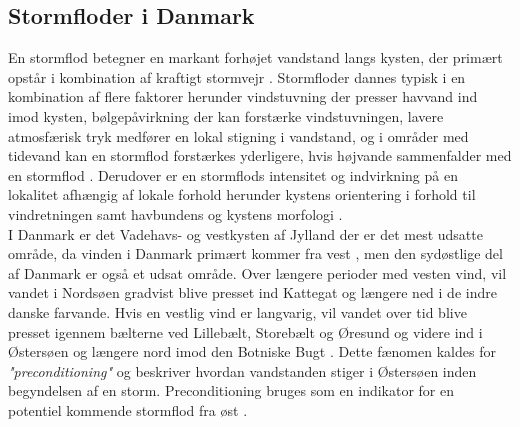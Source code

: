 
\subsection{Stormfloder i Danmark} \label{Afsnit: Stormfloder}

En stormflod betegner en markant forhøjet vandstand langs kysten, der primært opstår i kombination af kraftigt stormvejr \citep{shoreline_management_guidelines}. Stormfloder dannes typisk i en kombination af flere faktorer herunder vindstuvning der presser havvand ind imod kysten, bølgepåvirkning der kan forstærke vindstuvningen, lavere atmosfærisk tryk medfører en lokal stigning i vandstand, og i områder med tidevand kan en stormflod forstærkes yderligere, hvis højvande sammenfalder med en stormflod \citep{piecuch_high-tide_2022}. Derudover er en stormflods intensitet og indvirkning på en lokalitet afhængig af lokale forhold herunder kystens orientering i forhold til vindretningen samt havbundens og kystens morfologi \citep{noaa_storm, shoreline_management_guidelines}.\\

I Danmark er det Vadehavs- og vestkysten af Jylland der er det mest udsatte område, da vinden i Danmark primært kommer fra vest \citep{cappelen_dmi_2020}, men den sydøstlige del af Danmark er også et udsat område. Over længere perioder med vesten vind, vil vandet i Nordsøen gradvist blive presset ind Kattegat og længere ned i de indre danske farvande. Hvis en vestlig vind er langvarig, vil vandet over tid blive presset igennem bælterne ved Lillebælt, Storebælt og Øresund og videre ind i Østersøen og længere nord imod den Botniske Bugt \citep{kiesel_brief_2024, egusphere_baltic}. Dette fænomen kaldes for \textit{"preconditioning"} og beskriver hvordan vandstanden stiger i Østersøen inden begyndelsen af en storm. Preconditioning bruges som en indikator for en potentiel kommende stormflod fra øst \citep{kiesel_brief_2024, weisse_sea_2021}.\\   

